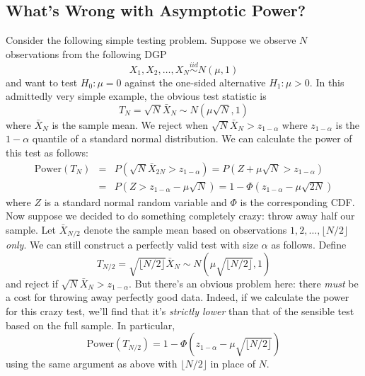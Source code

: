 \documentclass[12pt]{article}
\theoremstyle{definition}
\begin{document}
\subsection{What's Wrong with Asymptotic Power?}
Consider the following simple testing problem. Suppose we observe $N$ observations from the following DGP
$$X_1, X_2, \hdots, X_{N} \overset{iid}{\sim} N(\mu, 1)$$
and want to test $H_0\colon \mu = 0$ against the one-sided alternative $H_1\colon \mu >0$. In this admittedly very simple example, the obvious test statistic is 
	$$T_{N} = \sqrt{N} \bar{X}_{N} \sim N\left(\mu \sqrt{N}, 1\right)$$
where $\bar{X}_{N}$ is the sample mean. We reject when $\sqrt{N} \bar{X}_{N}>z_{1-\alpha}$ where $z_{1-\alpha}$ is the $1-\alpha$ quantile of a standard normal distribution. We can calculate the power of this test as follows:
\begin{eqnarray*}
\mbox{Power}(T_{N}) &=& P\left(\sqrt{N} \bar{X}_{2N}>z_{1-\alpha}\right) = P\left(Z + \mu\sqrt{N} >z_{1-\alpha}\right)\\
	&=&P\left(Z >z_{1-\alpha} - \mu\sqrt{N}\right) = 1 - \Phi\left(z_{1-\alpha} - \mu\sqrt{2N}\right)
\end{eqnarray*}
where $Z$ is a standard normal random variable and $\Phi$ is the corresponding CDF. Now suppose we decided to do something completely crazy: throw away half our sample. Let $\bar{X}_{N/2}$ denote the sample mean based on observations $1, 2, \hdots, \lfloor N/2 \rfloor $ \emph{only}. We can still construct a perfectly valid test with size $\alpha$ as follows. Define
	$$T_{N/2} = \sqrt{\lfloor N/2 \rfloor } \bar{X}_N \sim N\left(\mu \sqrt{\lfloor N/2 \rfloor }, 1\right)$$
and reject if $\sqrt{N} \bar{X}_N > z_{1-\alpha}$. But there's an obvious problem here: there \emph{must} be a cost for throwing away perfectly good data. Indeed, if we calculate the power for this crazy test, we'll find that it's \emph{strictly lower} than that of the sensible test based on the full sample. In particular,
	$$\mbox{Power}(T_{N/2}) = 1 - \Phi\left(z_{1-\alpha} - \mu\sqrt{\lfloor N/2 \rfloor }\right)$$
using the same argument as above with $\lfloor N/2 \rfloor $ in place of $N$.  
\end{document}
